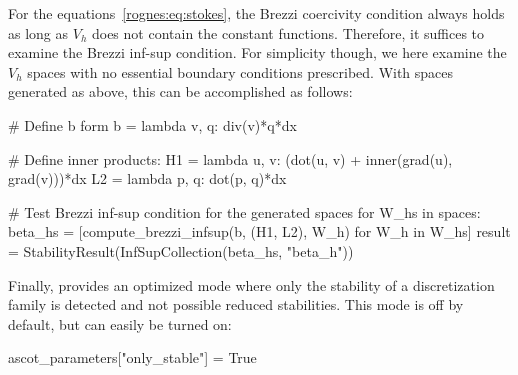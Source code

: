For the equations~\eqref{rognes:eq:stokes}, the Brezzi coercivity
condition always holds as long as $V_h$ does not contain the constant
functions. Therefore, it suffices to examine the Brezzi inf-sup
condition. For simplicity though, we here examine the $V_h$ spaces
with no essential boundary conditions prescribed. With spaces
generated as above, this can be accomplished as follows:
\begin{python}
# Define b form
b = lambda v, q: div(v)*q*dx

# Define inner products:
H1 = lambda u, v: (dot(u, v) + inner(grad(u), grad(v)))*dx
L2 = lambda p, q: dot(p, q)*dx

# Test Brezzi inf-sup condition for the generated spaces
for W_hs in spaces:
    beta_hs = [compute_brezzi_infsup(b, (H1, L2), W_h) for W_h in W_hs]
    result = StabilityResult(InfSupCollection(beta_hs, "beta_h"))
\end{python}
Finally, \rognesascot{} provides an optimized mode where only the
stability of a discretization family is detected and not possible
reduced stabilities. This mode is off by default, but can easily be
turned on:
\begin{python}
 ascot_parameters["only_stable"] = True
\end{python}

